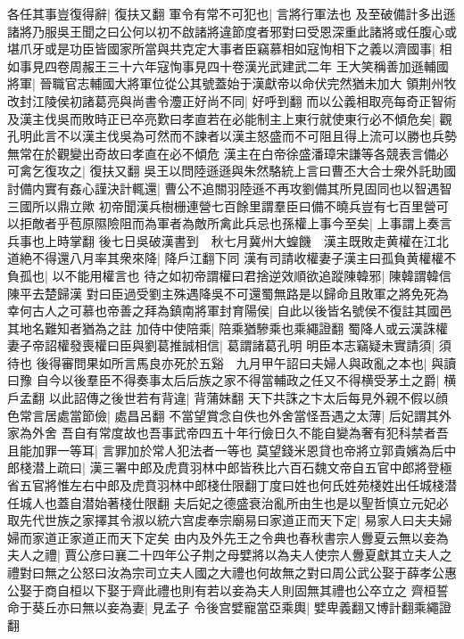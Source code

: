 各任其事豈復得辭|{
	復扶又翻}
軍令有常不可犯也|{
	言將行軍法也}
及至破備計多出遜諸將乃服吳王聞之曰公何以初不啟諸將違節度者邪對曰受恩深重此諸將或任腹心或堪爪牙或是功臣皆國家所當與共克定大事者臣竊慕相如寇恂相下之義以濟國事|{
	相如事見四卷周赧王三十六年寇恂事見四十卷漢光武建武二年}
王大笑稱善加遜輔國將軍|{
	晉職官志輔國大將軍位從公其號蓋始于漢獻帝以命伏完然猶未加大}
領荆州牧改封江陵侯初諸葛亮與尚書令灋正好尚不同|{
	好呼到翻}
而以公義相取亮每奇正智術及漢主伐吳而敗時正已卒亮歎曰孝直若在必能制主上東行就使東行必不傾危矣|{
	觀孔明此言不以漢主伐吳為可然而不諫者以漢主怒盛而不可阻且得上流可以勝也兵勢無常在於觀變出奇故曰孝直在必不傾危}
漢主在白帝徐盛潘璋宋謙等各競表言備必可禽乞復攻之|{
	復扶又翻}
吳王以問陸遜遜與朱然駱統上言曰曹丕大合士衆外託助國討備内實有姦心謹決計輒還|{
	曹公不追關羽陸遜不再攻劉備其所見固同也以智遇智三國所以鼎立歟}
初帝聞漢兵樹栅連營七百餘里謂羣臣曰備不曉兵豈有七百里營可以拒敵者乎苞原隰險阻而為軍者為敵所禽此兵忌也孫權上事今至矣|{
	上事謂上奏言兵事也上時掌翻}
後七日吳破漢書到　秋七月冀州大蝗饑　漢主既敗走黄權在江北道絶不得還八月率其衆來降|{
	降戶江翻下同}
漢有司請收權妻子漢主曰孤負黄權權不負孤也|{
	以不能用權言也}
待之如初帝謂權曰君捨逆效順欲追蹤陳韓邪|{
	陳韓謂韓信陳平去楚歸漢}
對曰臣過受劉主殊遇降吳不可還蜀無路是以歸命且敗軍之將免死為幸何古人之可慕也帝善之拜為鎮南將軍封育陽侯|{
	自此以後皆名號侯不復註其國邑其地名難知者猶為之註}
加侍中使陪乘|{
	陪乘猶驂乘也乘繩證翻}
蜀降人或云漢誅權妻子帝詔權發喪權曰臣與劉葛推誠相信|{
	葛謂諸葛孔明}
明臣本志竊疑未實請須|{
	須待也}
後得審問果如所言馬良亦死於五谿　九月甲午詔曰夫婦人與政亂之本也|{
	與讀曰豫}
自今以後羣臣不得奏事太后后族之家不得當輔政之任又不得横受茅土之爵|{
	横戶孟翻}
以此詔傳之後世若有背違|{
	背蒲妹翻}
天下共誅之卞太后每見外親不假以顔色常言居處當節儉|{
	處昌呂翻}
不當望賞念自佚也外舍當怪吾遇之太薄|{
	后妃謂其外家為外舍}
吾自有常度故也吾事武帝四五十年行儉日久不能自變為奢有犯科禁者吾且能加罪一等耳|{
	言罪加於常人犯法者一等也}
莫望錢米恩貸也帝將立郭貴嬪為后中郎棧潜上疏曰|{
	漢三署中郎及虎賁羽林中郎皆秩比六百石魏文帝自五官中郎將登極省五官將惟左右中郎及虎賁羽林中郎棧仕限翻丁度曰姓也何氏姓苑棧姓出任城棧潜任城人也蓋自潜始著棧仕限翻}
夫后妃之德盛衰治亂所由生也是以聖哲慎立元妃必取先代世族之家擇其令淑以統六宫䖍奉宗廟易曰家道正而天下定|{
	易家人曰夫夫婦婦而家道正家道正而天下定矣}
由内及外先王之令典也春秋書宗人釁夏云無以妾為夫人之禮|{
	賈公彦曰襄二十四年公子荆之母嬖將以為夫人使宗人釁夏獻其立夫人之禮對曰無之公怒曰汝為宗司立夫人國之大禮也何故無之對曰周公武公娶于薛孝公惠公娶于商自桓以下娶于齊此禮也則有若以妾為夫人則固無其禮也公卒立之}
齊桓誓命于葵丘亦曰無以妾為妻|{
	見孟子}
令後宫嬖寵當亞乘輿|{
	嬖卑義翻又博計翻乘繩證翻}
